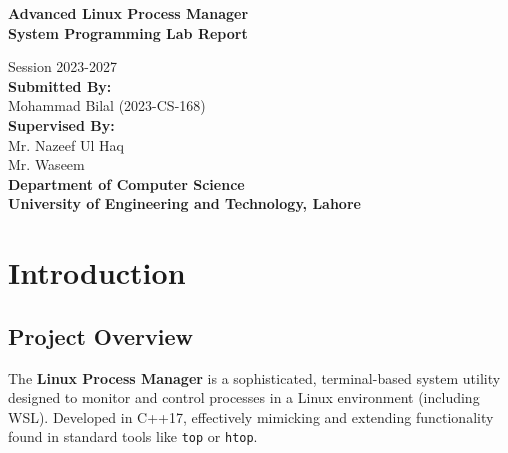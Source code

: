 \documentclass[a4paper,12pt]{article}
\begin{document}
\thispagestyle{empty}
\vspace*{1cm}
\begin{center}
    {\Huge\textbf{Advanced Linux Process Manager}} \\
    \vspace{0.5cm}
    {\Huge\textbf{System Programming Lab Report}}
    \vspace{1.5cm}

    
    {\large Session 2023-2027}\\[0.2cm]
    \vspace{1cm}
    {\Large\textbf{Submitted By:}}\\[0.6cm]
    {\large Mohammad Bilal (2023-CS-168)}\\[1.5cm]
    
    {\Large\textbf{Supervised By:}}\\[0.6cm]
    {\large Mr. Nazeef Ul Haq}\\
    {\large Mr. Waseem}\\[2cm]
    
    {\LARGE \textbf{Department of Computer Science}}\\[0.5cm]
    {\Huge \textbf{University of Engineering and Technology, Lahore}}\\[0.5cm]
    \vfill
\end{center}

\newpage
\pagestyle{fancy}
\fancyhf{}
\fancyfoot[C]{\thepage}

\newpage
\tableofcontents
\newpage

\section{Introduction}

\subsection{Project Overview}
The \textbf{Linux Process Manager} is a sophisticated, terminal-based system utility designed to monitor and control processes in a Linux environment (including WSL). Developed in C++17, effectively mimicking and extending functionality found in standard tools like \texttt{top} or \texttt{htop}.
\end{document}
